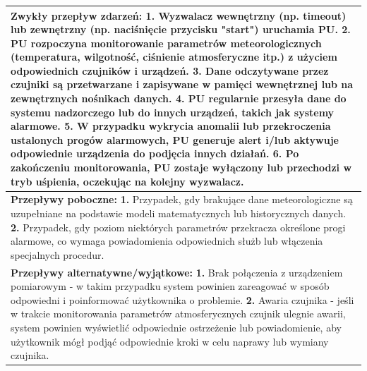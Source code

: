 \documentclass{article}
\begin{document}
\begin{center}
    \begin{center}
        \begin{tabular}{|l|l|l|}
        \hline
        \multicolumn{3}{|p{\dimexpr\linewidth-2\tabcolsep-2\arrayrulewidth}|}{\textbf{Zwykły przepływ zdarzeń:}
        \newline
        \textbf{1.} Wyzwalacz wewnętrzny (np. timeout) lub zewnętrzny (np. naciśnięcie przycisku "start") uruchamia PU.
        \newline
        \textbf{2.} PU rozpoczyna monitorowanie parametrów meteorologicznych (temperatura, wilgotność, ciśnienie atmosferyczne itp.) z użyciem odpowiednich czujników i urządzeń.
        \newline
        \textbf{3.} Dane odczytywane przez czujniki są przetwarzane i zapisywane w pamięci wewnętrznej lub na zewnętrznych nośnikach danych.
        \newline
        \textbf{4.} PU regularnie przesyła dane do systemu nadzorczego lub do innych urządzeń, takich jak systemy alarmowe.
        \newline
        \textbf{5.} W przypadku wykrycia anomalii lub przekroczenia ustalonych progów alarmowych, PU generuje alert i/lub aktywuje odpowiednie urządzenia do podjęcia innych działań.
        \newline
        \textbf{6.} Po zakończeniu monitorowania, PU zostaje wyłączony lub przechodzi w tryb uśpienia, oczekując na kolejny wyzwalacz.} \\
        \hline
        \hline
        \multicolumn{3}{|p{\dimexpr\linewidth-2\tabcolsep-2\arrayrulewidth}|}{\textbf{Przepływy poboczne:}
        \newline 
        \textbf{1.} Przypadek, gdy brakujące dane meteorologiczne są uzupełniane na podstawie modeli matematycznych lub historycznych danych.
        \newline
        \textbf{2.} Przypadek, gdy poziom niektórych parametrów przekracza określone progi alarmowe, co wymaga powiadomienia odpowiednich służb lub włączenia specjalnych procedur.} \\
        \hline
        \hline
        \multicolumn{3}{|p{\dimexpr\linewidth-2\tabcolsep-2\arrayrulewidth}|}{\textbf{Przepływy alternatywne/wyjątkowe:}
        \newline
        \textbf{1.} Brak połączenia z urządzeniem pomiarowym - w takim przypadku system powinien zareagować w sposób odpowiedni i poinformować użytkownika o problemie.
        \newline
        \textbf{2.} Awaria czujnika - jeśli w trakcie monitorowania parametrów atmosferycznych czujnik ulegnie awarii, system powinien wyświetlić odpowiednie ostrzeżenie lub powiadomienie, aby użytkownik mógł podjąć odpowiednie kroki w celu naprawy lub wymiany czujnika.
}
\end{tabular}
\end{center}
\end{center}
\end{document}
